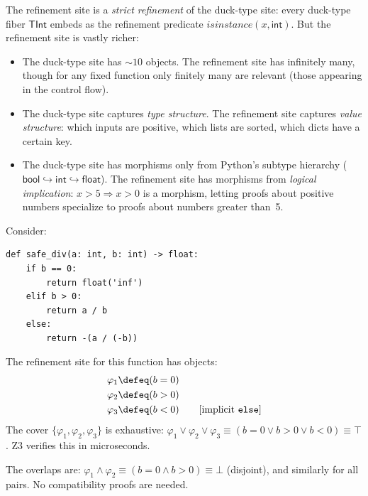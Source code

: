 \begin{remark}
\label{rem:duck-vs-refinement}
The refinement site is a \emph{strict refinement} of the duck-type
site: every duck-type fiber $\mathsf{TInt}$ embeds as the refinement
predicate $\mathit{isinstance}(x, \mathsf{int})$.  But the refinement
site is vastly richer:
\begin{itemize}
\item The duck-type site has $\sim 10$ objects.
  The refinement site has infinitely many, though for any fixed
  function only finitely many are relevant (those appearing in the
  control flow).
\item The duck-type site captures \emph{type structure}.
  The refinement site captures \emph{value structure}: which
  inputs are positive, which lists are sorted, which dicts
  have a certain key.
\item The duck-type site has morphisms only from Python's subtype
  hierarchy ($\mathsf{bool} \hookrightarrow \mathsf{int}
  \hookrightarrow \mathsf{float}$).  The refinement site has
  morphisms from \emph{logical implication}: $x > 5 \Rightarrow x > 0$
  is a morphism, letting proofs about positive numbers specialize
  to proofs about numbers greater than~5.
\end{itemize}
\end{remark}

\begin{example}
\label{ex:site-extraction}
Consider:
\begin{lstlisting}
def safe_div(a: int, b: int) -> float:
    if b == 0:
        return float('inf')
    elif b > 0:
        return a / b
    else:
        return -(a / (-b))
\end{lstlisting}
The refinement site for this function has objects:
\begin{align*}
  \varphi_1 &\defeq (b = 0) \\
  \varphi_2 &\defeq (b > 0) \\
  \varphi_3 &\defeq (b < 0) \qquad [\text{implicit \texttt{else}}]
\end{align*}
The cover $\{\varphi_1, \varphi_2, \varphi_3\}$ is exhaustive:
$\varphi_1 \vee \varphi_2 \vee \varphi_3 \equiv (b = 0 \vee b > 0
\vee b < 0) \equiv \top$.  Z3 verifies this in microseconds.

The overlaps are:
$\varphi_1 \wedge \varphi_2 \equiv (b = 0 \wedge b > 0) \equiv \bot$
(disjoint), and similarly for all pairs.  No compatibility proofs are
needed.
\end{example}


